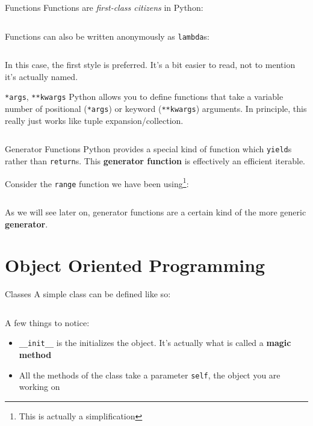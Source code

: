 \documentclass{lug}
\begin{document}
\begin{frame}{Functions}
    Functions are \emph{first-class citizens} in Python:
    \inputminted{pycon}{console/function.py}

    \pause

    Functions can also be written anonymously as \texttt{lambda}s:
    \inputminted{pycon}{console/lambda.py}

    \pause
    \small
    In this case, the first style is preferred. It's a bit easier to read, not
    to mention it's actually named.

\end{frame}

\begin{frame}{\texttt{*args}, \texttt{**kwargs}}
    Python allows you to define functions that take a variable number of
    positional (\texttt{*args}) or keyword (\texttt{**kwargs}) arguments. In
    principle, this really just works like tuple expansion/collection.

    \pause

    \inputminted{python3}{examples/args_kwargs.py}
\end{frame}

\begin{frame}{Generator Functions}
    \small
    Python provides a special kind of function which \texttt{yield}s rather
    than \texttt{return}s. This \textbf{generator function} is effectively an
    efficient iterable.

    Consider the \texttt{range} function we have been using\footnote{This is
    actually a simplification}:
    \inputminted{python3}{examples/rangefunction.py}

    \pause

    As we will see later on, generator functions are a certain kind of the more
    generic \textbf{generator}.

\end{frame}

\section{Object Oriented Programming}

\begin{frame}{Classes}
    A simple class can be defined like so:
    \inputminted{python3}{examples/simpleclass.py}

    \pause

    A few things to notice:
    \begin{itemize}
        \item \texttt{\_\_init\_\_} is the initializes the object. It's
            actually what is called a \textbf{magic method}
        \item All the methods of the class take a parameter \texttt{self}, the
            object you are working on
    \end{itemize}
\end{frame}
\end{document}
